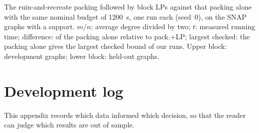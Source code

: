 \begin{table}[!tbp]
\centering
\caption{The ruin-and-recreate packing followed by block LPs against that packing alone with the
same nominal budget of \SI{1200}{s}, one run each (seed~0), on the SNAP
graphs with a support.  $m/n$: average degree divided by two; $t$: measured
running time; difference: of the packing alone relative to pack.+LP;
largest checked: the packing alone gives the largest checked bound of our
runs.  Upper block: development graphs; lower block: held-out graphs.}
\label{tab:snap-eqtime}
\footnotesize
\begin{adjustbox}{max width=\textwidth}\end{adjustbox}
\end{table}



\section{Development log}\label{app:devlog}

This appendix records which data informed which decision, so that the
reader can judge which results are out of sample.

